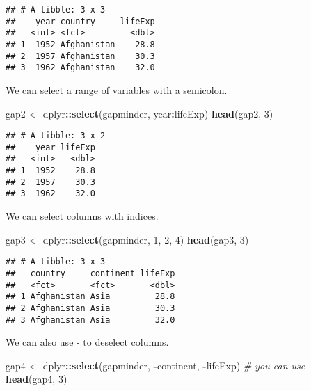 \documentclass[
]{article}
\newenvironment{Shaded}{\begin{snugshade}}{\end{snugshade}}
\newcommand{\CommentTok}[1]{\textcolor[rgb]{0.56,0.35,0.01}{\textit{#1}}}
\newcommand{\DecValTok}[1]{\textcolor[rgb]{0.00,0.00,0.81}{#1}}
\newcommand{\FunctionTok}[1]{\textcolor[rgb]{0.13,0.29,0.53}{\textbf{#1}}}
\newcommand{\NormalTok}[1]{#1}
\newcommand{\OtherTok}[1]{\textcolor[rgb]{0.56,0.35,0.01}{#1}}
\newcommand{\SpecialCharTok}[1]{\textcolor[rgb]{0.81,0.36,0.00}{\textbf{#1}}}
\begin{document}
\begin{verbatim}
## # A tibble: 3 x 3
##    year country     lifeExp
##   <int> <fct>         <dbl>
## 1  1952 Afghanistan    28.8
## 2  1957 Afghanistan    30.3
## 3  1962 Afghanistan    32.0
\end{verbatim}

We can select a range of variables with a semicolon.

\begin{Shaded}
\begin{Highlighting}[]
\NormalTok{gap2 }\OtherTok{\textless{}{-}}\NormalTok{ dplyr}\SpecialCharTok{::}\FunctionTok{select}\NormalTok{(gapminder, year}\SpecialCharTok{:}\NormalTok{lifeExp)}
\FunctionTok{head}\NormalTok{(gap2, }\DecValTok{3}\NormalTok{)}
\end{Highlighting}
\end{Shaded}

\begin{verbatim}
## # A tibble: 3 x 2
##    year lifeExp
##   <int>   <dbl>
## 1  1952    28.8
## 2  1957    30.3
## 3  1962    32.0
\end{verbatim}

We can select columns with indices.

\begin{Shaded}
\begin{Highlighting}[]
\NormalTok{gap3 }\OtherTok{\textless{}{-}}\NormalTok{ dplyr}\SpecialCharTok{::}\FunctionTok{select}\NormalTok{(gapminder, }\DecValTok{1}\NormalTok{, }\DecValTok{2}\NormalTok{, }\DecValTok{4}\NormalTok{)}
\FunctionTok{head}\NormalTok{(gap3, }\DecValTok{3}\NormalTok{)}
\end{Highlighting}
\end{Shaded}

\begin{verbatim}
## # A tibble: 3 x 3
##   country     continent lifeExp
##   <fct>       <fct>       <dbl>
## 1 Afghanistan Asia         28.8
## 2 Afghanistan Asia         30.3
## 3 Afghanistan Asia         32.0
\end{verbatim}

We can also use - to deselect columns.

\begin{Shaded}
\begin{Highlighting}[]
\NormalTok{gap4 }\OtherTok{\textless{}{-}}\NormalTok{ dplyr}\SpecialCharTok{::}\FunctionTok{select}\NormalTok{(gapminder, }\SpecialCharTok{{-}}\NormalTok{continent, }\SpecialCharTok{{-}}\NormalTok{lifeExp) }\CommentTok{\# you can use}
\FunctionTok{head}\NormalTok{(gap4, }\DecValTok{3}\NormalTok{)}
\end{Highlighting}
\end{Shaded}
\end{document}
